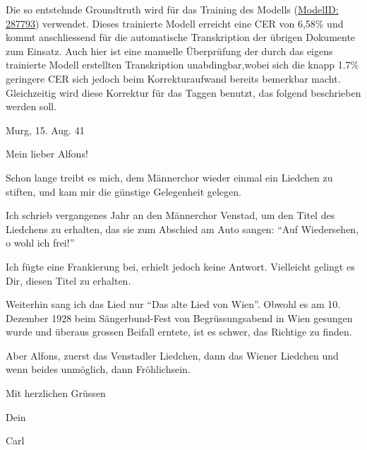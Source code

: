 \documentclass[12pt, a4paper, ngerman, bidi=default]{article}
\let\cite\footcite
\begin{document}
\begin{minipage}[t]{0.52\textwidth}
  \justifying
  \noindent
Die so entstehnde Groundtruth wird für das Training des Modells
(\href{https://app.transkribus.org/models/public/287793}{ModelID: 287793})\footnotemark{} verwendet.
Dieses trainierte Modell erreicht eine CER von 6,58\% und kommt anschliessend für die automatische Transkription der übrigen Dokumente zum Einsatz. Auch hier ist eine manuelle Überprüfung der durch das eigens trainierte Modell erstellten
Transkription unabdingbar,wobei sich die knapp 1.7\% geringere CER sich jedoch beim Korrekturaufwand bereits bemerkbar macht. Gleichzeitig wird diese Korrektur für das Taggen benutzt, das folgend beschrieben werden soll.

\end{minipage}
\footnotetext{\cite[vgl.][]{burkhardt_transkribus_2024}}
\begin{minipage}[t]{0.5\textwidth}
    \centering
    \vspace*{0cm}
  \begin{tcolorbox}[colback=oldLetter, colframe=black, sharp corners, width=0.8\textwidth]
\tiny{Murg, 15. Aug. 41

Mein lieber Alfons!

Schon lange treibt es mich, dem Männerchor wieder einmal ein Liedchen zu stiften, und kam mir die günstige Gelegenheit gelegen.

Ich schrieb vergangenes Jahr an den Männerchor Venstad, um den Titel des Liedchens zu erhalten, das sie zum Abschied am Auto sangen: \enquote{Auf Wiedersehen, o wohl ich frei!}

Ich fügte eine Frankierung bei, erhielt jedoch keine Antwort. Vielleicht gelingt es Dir, diesen Titel zu erhalten.

Weiterhin sang ich das Lied nur \enquote{Das alte Lied von Wien}. Obwohl es am 10. Dezember 1928 beim Sängerbund-Fest von Begrüssungsabend in Wien gesungen wurde und überaus grossen Beifall erntete, ist es schwer, das Richtige zu finden.

Aber Alfons, zuerst das Venstadler Liedchen, dann das Wiener Liedchen und wenn beides unmöglich, dann Fröhlichsein.

Mit herzlichen Grüssen

Dein

Carl}

\end{tcolorbox}
\end{minipage}
\hfill%
\end{document}
